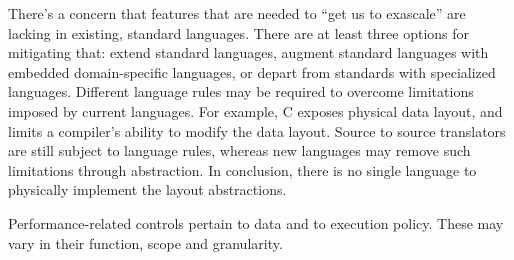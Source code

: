 There's a concern that features that are needed to ``get us to
exascale'' are lacking in existing, standard languages.  There are at
least three options for mitigating that: extend standard languages,
augment standard languages with embedded domain-specific languages, or
depart from standards with specialized languages.  Different language
rules may be required to overcome limitations imposed by current
languages. For example, C exposes physical data layout, and limits a
compiler's ability to modify the data layout. Source to source
translators are still subject to language rules, whereas new languages
may remove such limitations through abstraction.  In conclusion, there
is no single language to physically implement the layout abstractions.

Performance-related controls pertain to data and to execution policy.  These may vary in their function, scope and granularity.
